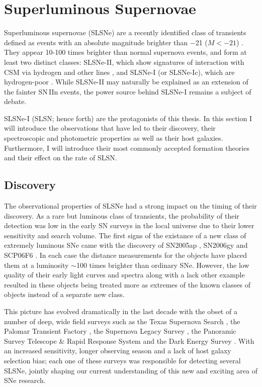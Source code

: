 \section{Superluminous Supernovae}
Superluminous supernovae (SLSNe) are a recently identified class of transients defined as events with an absolute magnitude brighter than $-$21 ($M<-21$) \citep{Gal-Yam2012}. They appear 10-100 times brighter than normal supernova events, and form at least two distinct classes: SLSNe-II, which show signatures of interaction with CSM via hydrogen and other lines \citep{2007ApJ...659L..13O,2007ApJ...666.1116S,2011ApJ...735..106D}, and SLSNe-I (or SLSNe-Ic), which are hydrogen-poor \citep{Quimby2011}. While SLSNe-II may naturally be explained as an extension of the fainter SN\,IIn events, the power source behind SLSNe-I remains a subject of debate.

SLSNe-I (SLSN; hence forth) are the protagonists of this thesis. In this section I will introduce the observations that have led to their discovery, their spectroscopic and photometric properties as well as their host galaxies. Furthermore, I will introduce their most commonly accepted formation theories and their effect on the rate of SLSN.

\subsection{Discovery}
The observational properties of SLSNe had a strong impact on the timing of their discovery. As a rare but luminous class of transients, the probability of their detection was low in the early SN surveys in the local universe due to their lower sensitivity and search volume. The first signs of the existance of a new class of extremely luminous SNe came with the discovery of SN2005ap \citep{Quimby2007}, SN2006gy \citep{Ofek2007} and SCP06F6 \citep{Barbary2009}. In each case the distance measurements for the objects have placed them at a luminosity $\sim$100 times brighter than ordinary SNe. However, the low quality of their early light curves and spectra along with a lack other example resulted in these objects being treated more as extremes of the known classes of objects instead of a separate new class.

This picture has evolved dramatically in the last decade with the obset of a number of deep, wide field surveys such as the Texas Supernova Search \citep[TSS;][]{2006PhDT........13Q}, the Palomar Transient Factory \citep[PTF;][]{2009PASP..121.1395L, 2009PASP..121.1334R}, the Supernova Legacy Survey \citep[SNLS;][]{2006A&amp;A...447...31A,2010A&amp;A...523A...7G,2010AJ....140..518P}, the Panoramic Survey Telescope \& Rapid Response System \citep[Pan-STARRS;][]{2010SPIE.7733E..0EK} and the Dark Energy Survey \citep[DES;][]{2005IJMPA..20.3121F}. With an increased sensitivity, longer observing season and a lack of host galaxy selection bias; each one of these surveys was responsible for detecting several SLSNe, jointly shaping our current understanding of this new and exciting area of SNe research.

